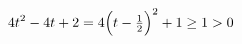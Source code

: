 \documentclass[preview]{standalone}
\begin{document}
\begin{align*}
\special{dvisvgm:raw <g id='unique000'>}4t^2-4t+2=4\Big(t-\tfrac{1}{2}\Big)^2+1\ge 1>0\special{dvisvgm:raw </g>}
\end{align*}
\end{document}
